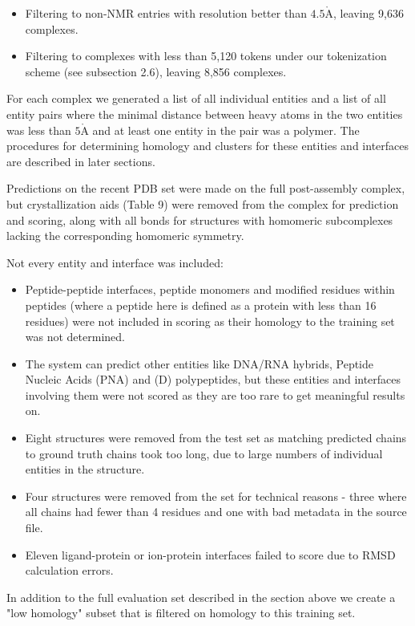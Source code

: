 \documentclass[10pt]{article}
\def\AA{\mathring{\mathrm{A}}}
\begin{document}
\begin{itemize}
  \item Filtering to non-NMR entries with resolution better than $4.5 \AA$, leaving 9,636 complexes.
  \item Filtering to complexes with less than 5,120 tokens under our tokenization scheme (see subsection 2.6), leaving 8,856 complexes.
\end{itemize}

For each complex we generated a list of all individual entities and a list of all entity pairs where the minimal distance between heavy atoms in the two entities was less than $5 \AA$ and at least one entity in the pair was a polymer. The procedures for determining homology and clusters for these entities and interfaces are described in later sections.

Predictions on the recent PDB set were made on the full post-assembly complex, but crystallization aids (Table 9) were removed from the complex for prediction and scoring, along with all bonds for structures with homomeric subcomplexes lacking the corresponding homomeric symmetry.

Not every entity and interface was included:

\begin{itemize}
  \item Peptide-peptide interfaces, peptide monomers and modified residues within peptides (where a peptide here is defined as a protein with less than 16 residues) were not included in scoring as their homology to the training set was not determined.
  \item The system can predict other entities like DNA/RNA hybrids, Peptide Nucleic Acids (PNA) and (D) polypeptides, but these entities and interfaces involving them were not scored as they are too rare to get meaningful results on.
  \item Eight structures were removed from the test set as matching predicted chains to ground truth chains took too long, due to large numbers of individual entities in the structure.
  \item Four structures were removed from the set for technical reasons - three where all chains had fewer than 4 residues and one with bad metadata in the source file.
  \item Eleven ligand-protein or ion-protein interfaces failed to score due to RMSD calculation errors.
\end{itemize}

In addition to the full evaluation set described in the section above we create a "low homology" subset that is filtered on homology to this training set.
\end{document}

